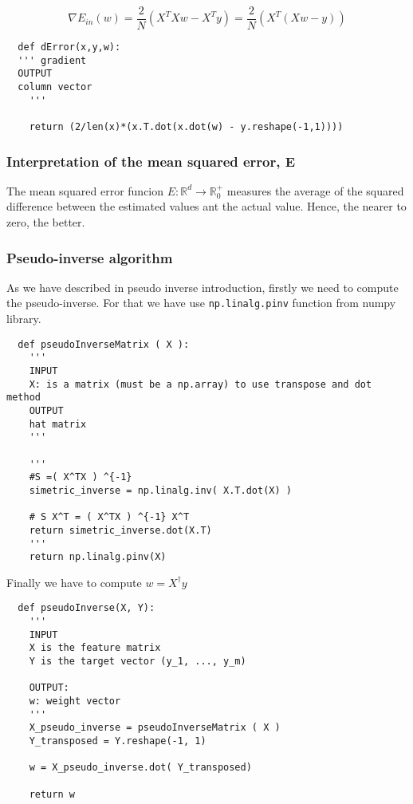   $$\nabla E_{in}(w) = \frac{2}{N}(X^TXw - X^T y)= \frac{2}{N}(X^T(Xw -  y))$$
  
\begin{verbatim}
  def dError(x,y,w):
  ''' gradient
  OUTPUT
  column vector
    '''

    return (2/len(x)*(x.T.dot(x.dot(w) - y.reshape(-1,1))))
  \end{verbatim}

  \subsubsection{Interpretation of the mean squared error, E}
  The mean squared error funcion $E: \mathbb R ^d \longrightarrow \mathbb R^+_0$ measures the average of the squared difference between the estimated values ant the actual value\cite{MSE}. Hence, the nearer to zero, the better.

  
  

\subsubsection{Pseudo-inverse algorithm}

As we have described in pseudo inverse introduction, firstly we need to compute the pseudo-inverse. For that we have use  \texttt{np.linalg.pinv} \cite{pseudo-inverse}function from numpy library.

\begin{verbatim}
  def pseudoInverseMatrix ( X ):
    '''
    INPUT 
    X: is a matrix (must be a np.array) to use transpose and dot method
    OUTPUT
    hat matrix 
    '''

    '''
    #S =( X^TX ) ^{-1}
    simetric_inverse = np.linalg.inv( X.T.dot(X) )

    # S X^T = ( X^TX ) ^{-1} X^T
    return simetric_inverse.dot(X.T)
    '''
    return np.linalg.pinv(X)
\end{verbatim}

Finally we have to compute $w = X^\dagger y$


\begin{verbatim}
  def pseudoInverse(X, Y):
    ''' 
    INPUT
    X is the feature matrix 
    Y is the target vector (y_1, ..., y_m)
    
    OUTPUT: 
    w: weight vector
    '''
    X_pseudo_inverse = pseudoInverseMatrix ( X )
    Y_transposed = Y.reshape(-1, 1)
    
    w = X_pseudo_inverse.dot( Y_transposed)
    
    return w

  \end{verbatim}

